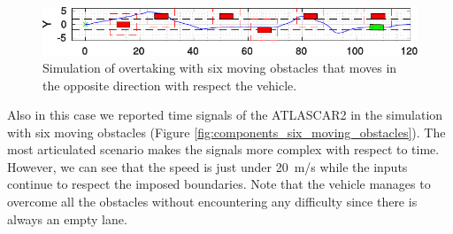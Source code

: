\begin{figure}[b!]
\begin{minipage}[t]{\textwidth}
	\end{minipage}
	\begin{minipage}[t]{\textwidth}
		\includegraphics[width=\textwidth]{./figure/6_obstacles/6_obstacles_6.pdf}
	\end{minipage}
	\caption{Simulation of overtaking with six moving obstacles that moves in the opposite direction with respect the vehicle.}
	\label{fig:obstacleAvoidance_six_obstacles}
\end{figure}

Also in this case we reported time signals of the ATLASCAR2 in the simulation with six moving obstacles (Figure \ref{fig:components_six_moving_obstacles}). The most articulated scenario makes the signals more complex with respect to time. However, we can see that the speed is just under \SI{20}{m/s} while the inputs continue to respect the imposed boundaries. Note that the vehicle manages to overcome all the obstacles without encountering any difficulty since there is always an empty lane.
